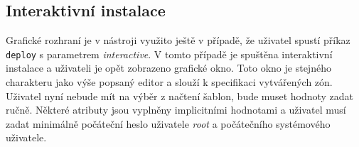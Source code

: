 \subsection{Interaktivní instalace}
\label{chapter:implementation:gui:interactive}
Grafické rozhraní je v nástroji využito ještě v případě, že uživatel spustí příkaz \verb|deploy| s parametrem \textit{interactive}.
V tomto případě je spuštěna interaktivní instalace a uživateli je opět zobrazeno grafické okno. Toto okno je stejného charakteru
jako výše popsaný editor a slouží k specifikaci vytvářených zón. Uživatel nyní nebude mít na výběr z načtení šablon, bude muset
hodnoty zadat ručně. Některé atributy jsou vyplněny implicitními hodnotami a uživatel musí zadat minimálně počáteční heslo 
uživatele \textit{root} a počátečního systémového uživatele.